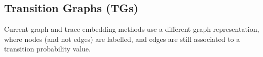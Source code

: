 %
%



\subsection{Transition Graphs (TGs)}\label{subsec:ppn}
Current graph and trace embedding methods use a different graph representation, where nodes (and not edges) are labelled, 
and edges are still associated to a transition probability value.

